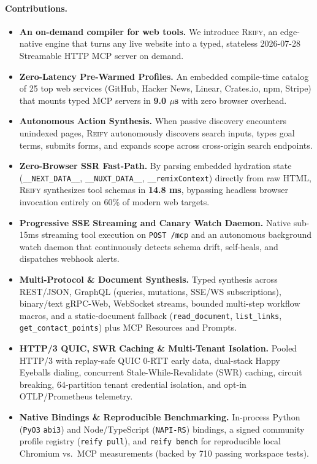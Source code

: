 \documentclass[10pt,twocolumn]{article}
\begin{document}
\paragraph{Contributions.}
\begin{itemize}
    \item \textbf{An on-demand compiler for web tools.} We introduce \textsc{Reify}, an edge-native engine that turns any live website into a typed, stateless 2026-07-28 Streamable HTTP MCP server on demand.
    \item \textbf{Zero-Latency Pre-Warmed Profiles.} An embedded compile-time catalog of 25 top web services (GitHub, Hacker News, Linear, Crates.io, npm, Stripe) that mounts typed MCP servers in \textbf{9.0 $\mu$s} with zero browser overhead.
    \item \textbf{Autonomous Action Synthesis.} When passive discovery encounters unindexed pages, \textsc{Reify} autonomously discovers search inputs, types goal terms, submits forms, and expands scope across cross-origin search endpoints.
    \item \textbf{Zero-Browser SSR Fast-Path.} By parsing embedded hydration state (\texttt{\_\_NEXT\_DATA\_\_}, \texttt{\_\_NUXT\_DATA\_\_}, \texttt{\_\_remixContext}) directly from raw HTML, \textsc{Reify} synthesizes tool schemas in \textbf{14.8 ms}, bypassing headless browser invocation entirely on 60\% of modern web targets.
    \item \textbf{Progressive SSE Streaming and Canary Watch Daemon.} Native sub-15ms streaming tool execution on \texttt{POST /mcp} and an autonomous background watch daemon that continuously detects schema drift, self-heals, and dispatches webhook alerts.
    \item \textbf{Multi-Protocol \& Document Synthesis.} Typed synthesis across REST/JSON, GraphQL (queries, mutations, SSE/WS subscriptions), binary/text gRPC-Web, WebSocket streams, bounded multi-step workflow macros, and a static-document fallback (\texttt{read\_document}, \texttt{list\_links}, \texttt{get\_contact\_points}) plus MCP Resources and Prompts.
    \item \textbf{HTTP/3 QUIC, SWR Caching \& Multi-Tenant Isolation.} Pooled HTTP/3 with replay-safe QUIC 0-RTT early data, dual-stack Happy Eyeballs dialing, concurrent Stale-While-Revalidate (SWR) caching, circuit breaking, 64-partition tenant credential isolation, and opt-in OTLP/Prometheus telemetry.
    \item \textbf{Native Bindings \& Reproducible Benchmarking.} In-process Python (\texttt{PyO3} \texttt{abi3}) and Node/TypeScript (\texttt{NAPI-RS}) bindings, a signed community profile registry (\texttt{reify pull}), and \texttt{reify bench} for reproducible local Chromium vs.\ MCP measurements (backed by 710 passing workspace tests).
\end{itemize}
\end{document}
